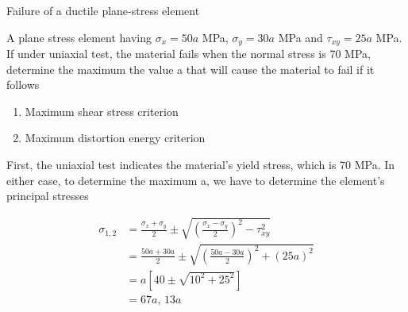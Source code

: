 \documentclass[
fontsize=10pt,
a4paper,
twosides=false,
open=any,
svgnames,
]{kaobook} %
\begin{document}
\begin{example} Failure of a ductile plane-stress element

  A plane stress element having $\sigma_x = 50a$ MPa, $\sigma_y = 30a$ MPa and $\tau_{xy} =  25a$ MPa. If under uniaxial test, the material fails when the normal stress is 70 MPa, determine the maximum the value a that will cause the material to fail if it follows

  \begin{figure}[H]
    \centering
  \end{figure} 

    \begin{enumerate}
  \item Maximum shear stress criterion
  \item Maximum distortion energy criterion
  \end{enumerate}

  First, the uniaxial test indicates the material’s yield stress, which is 70 MPa. In either case, to determine the maximum a, we have to determine the element’s principal stresses

  \begin{align*}
      \sigma_{1,2} &= \frac{\sigma_x + \sigma_y}{2} \pm \sqrt {\left( \frac{\sigma_x - \sigma_y}{2} \right)^2 - \tau _{xy}^2}  \\ 
                   &= \frac{50a + 30a}{2} \pm \sqrt {\left( \frac{50a - 30a}{2} \right)^2 + (25a)^2}  \\ 
                   &= a\left[ 40 \pm \sqrt {10^2 + 25^2} \right] \\ 
                   &= 67a \text{, } 13a \\ 
  \end{align*}
  

\end{example}
\end{document}
